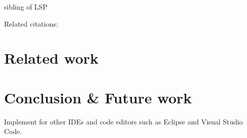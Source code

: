 \documentclass[sigconf]{acmart}
\begin{document}
sibling of LSP \cite{microsoftLanguageServerProtocol2023}

Related citations:
\cite{jeanjeanIDECodeReifying2021,raskVisualStudioCode2020,borkLanguageServerProtocol2023}

\section{Related work} \label{sec:relatedWork}

\section{Conclusion \& Future work} \label{sec:conclusion}




Implement for other IDEs and code editors such as Eclipse \cite{desrivieresEclipsePlatformIntegrating2004} and Visual Studio Code.





\end{document}
